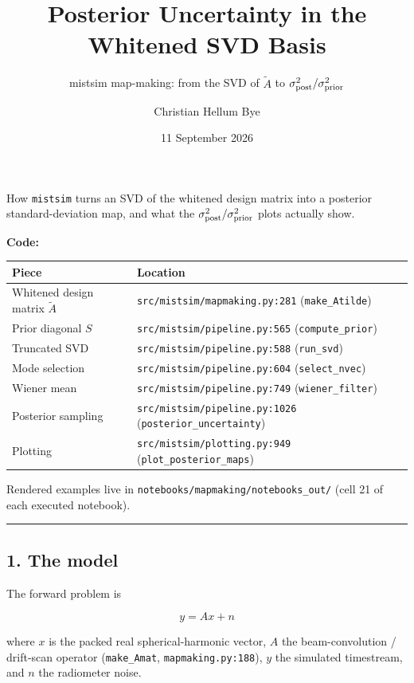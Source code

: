 \documentclass[
  11pt,
]{article}
\title{Posterior Uncertainty in the Whitened SVD Basis}
\subtitle{mistsim map-making: from the SVD of \(\tilde{A}\) to
\(\sigma^2_{\rm post}/\sigma^2_{\rm prior}\)}
\author{Christian Hellum Bye}
\date{11 September 2026}
\begin{document}
\maketitle

{
\hypersetup{linkcolor=}
\setcounter{tocdepth}{2}
\tableofcontents
}
How \texttt{mistsim} turns an SVD of the whitened design matrix into a
posterior standard-deviation map, and what the
\(\sigma^2_{\rm post}/\sigma^2_{\rm prior}\) plots actually show.

\textbf{Code:}

\begin{longtable}[]{@{}ll@{}}
\toprule\noalign{}
Piece & Location \\
\midrule\noalign{}
\endhead
\bottomrule\noalign{}
\endlastfoot
Whitened design matrix \(\tilde{A}\) &
\texttt{src/mistsim/mapmaking.py:281} (\texttt{make\_Atilde}) \\
Prior diagonal \(S\) & \texttt{src/mistsim/pipeline.py:565}
(\texttt{compute\_prior}) \\
Truncated SVD & \texttt{src/mistsim/pipeline.py:588}
(\texttt{run\_svd}) \\
Mode selection & \texttt{src/mistsim/pipeline.py:604}
(\texttt{select\_nvec}) \\
Wiener mean & \texttt{src/mistsim/pipeline.py:749}
(\texttt{wiener\_filter}) \\
Posterior sampling & \texttt{src/mistsim/pipeline.py:1026}
(\texttt{posterior\_uncertainty}) \\
Plotting & \texttt{src/mistsim/plotting.py:949}
(\texttt{plot\_posterior\_maps}) \\
\end{longtable}

Rendered examples live in \texttt{notebooks/mapmaking/notebooks\_out/}
(cell 21 of each executed notebook).

\begin{center}\rule{0.5\linewidth}{0.5pt}\end{center}

\hypertarget{1-the-model}{%
\subsection{1. The model}\label{1-the-model}}

The forward problem is

\[ y = A x + n \]

where \(x\) is the packed real spherical-harmonic vector, \(A\) the
beam-convolution / drift-scan operator (\texttt{make\_Amat},
\texttt{mapmaking.py:188}), \(y\) the simulated timestream, and \(n\)
the radiometer noise.
\end{document}
